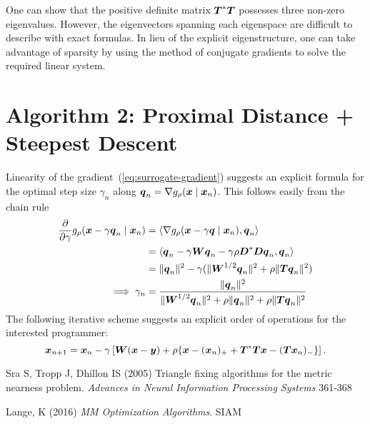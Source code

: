 \documentclass{article}
\begin{document}
One can show that the positive definite matrix \(\boldsymbol{T}^{\ast} \boldsymbol{T}\) possesses three non-zero eigenvalues.
However, the eigenvectors spanning each eigenspace are difficult to describe with exact formulas.
In lieu of the explicit eigenstructure, one can take advantage of sparsity by using the method of conjugate gradients to solve the required linear system.

\section*{\center Algorithm 2: Proximal Distance + Steepest Descent}

Linearity of the gradient~(\ref{eq:surrogate-gradient}) suggests an explicit formula for the optimal step size \(\gamma_{n}\) along \(\boldsymbol{q}_{n} = \nabla g_{\rho}(\boldsymbol{x} \mid \boldsymbol{x}_{n})\).
This follows easily from the chain rule
\begin{equation*}
  \begin{split}
    \frac{\partial}{\partial \gamma} g_{\rho}(\boldsymbol{x} - \gamma \boldsymbol{q}_{n} \mid \boldsymbol{x}_{n})
    &=
    \langle{\nabla g_{\rho}(\boldsymbol{x}- \gamma \boldsymbol{q}\mid \boldsymbol{x}_{n}), \boldsymbol{q}_{n}}\rangle \\
    &=
    \langle{
      \boldsymbol{q}_{n}
        - \gamma \boldsymbol{W}\boldsymbol{q}_{n}
        - \gamma \rho \boldsymbol{D}^{\ast} \boldsymbol{D}\boldsymbol{q}_{n},
     \boldsymbol{q}_{n}}\rangle \\
    &=
    \lVert{\boldsymbol{q}_{n}}\rVert^{2}
    - \gamma (\lVert{\boldsymbol{W}^{1/2} \boldsymbol{q}_{n}}\rVert^{2} + \rho \lVert{\boldsymbol{T}\boldsymbol{q}_{n}}\rVert^{2}) \\
    \implies \gamma_{n}
    &=
    \frac{\lVert{\boldsymbol{q}_{n}}\rVert^{2}}{
        \lVert{\boldsymbol{W}^{1/2} \boldsymbol{q}_{n}}\rVert^{2}
        + \rho \lVert{\boldsymbol{q}_{n}}\rVert^{2}
        + \rho \lVert{\boldsymbol{T}\boldsymbol{q}_{n}}\rVert^{2}
    }
  \end{split}
\end{equation*}
The following iterative scheme suggests an explicit order of operations for the interested programmer:
\begin{equation*}
    \boldsymbol{x}_{n+1}
    =
    \boldsymbol{x}_{n}
    - \gamma \left[
    \boldsymbol{W} (\boldsymbol{x} - \boldsymbol{y}) + \rho \{
        \boldsymbol{x} - (\boldsymbol{x}_{n})_{+}
        + \boldsymbol{T}^{\ast} \boldsymbol{T} \boldsymbol{x} - (\boldsymbol{T} \boldsymbol{x}_{n})_{-}
        \}
    \right].
\end{equation*}
\begin{thebibliography}{99}
    Sra S, Tropp J, Dhillon IS (2005) {Triangle fixing algorithms for the metric nearness problem}. {\it Advances in Neural Information Processing Systems} 361-368
    
    Lange, K (2016) {\it MM Optimization Algorithms}. SIAM
\end{thebibliography}
\end{document}
